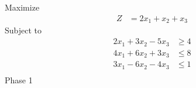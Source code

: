 \documentclass[12pt]{article}
\begin{document}
\subsection{}

Maximize
\begin{align*}
Z                    & = 2x_{1}+x_{2}+x_{3}
\end{align*}
Subject to
\begin{align*}
2x_{1}+3x_{2}-5x_{3} & \ge 4                                                                                                                                                                            \\
4x_{1}+6x_{2}+3x_{3} & \le 8                                                                                                                                                                            \\
3x_{1}-6x_{2}-4x_{3} & \le 1                                                                                                                                                                            \\
\end{align*}
Phase 1                                                                                                                                                                                                 \\[5pt]
\end{document}
